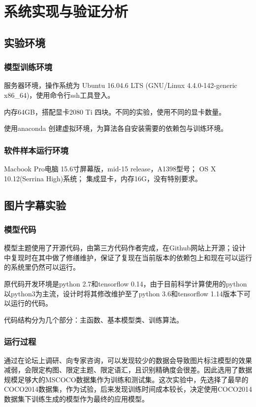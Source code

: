 
\chapter{系统实现与验证分析}
\section{实验环境}
\subsection{模型训练环境}
服务器环境，操作系统为
Ubuntu 16.04.6 LTS (GNU/Linux 4.4.0-142-generic x86\_64)，使用命令行ssh工具登入。

内存64GB，搭配显卡2080 Ti 四块。不同的实验，使用不同的显卡数量。

使用anaconda 创建虚拟环境，为算法各自安装需要的依赖包与训练环境。
\subsection{软件样本运行环境}
Macbook Pro电脑 15.6寸屏幕版，mid-15 release，A1398型号；
OS X 10.12(Serrina High)系统；
集成显卡，内存16G，没有特别要求。

\section{图片字幕实验}
\subsection{模型代码}
模型主题使用了开源代码，由第三方代码作者完成，在Github网站上开源；设计中复现时在其中做了修缮维护，保证了复现在当前版本的依赖包上和现在可以运行的系统里仍然可以运行。

原代码开发环境是python 2.7和tensorflow 0.14，由于目前科学计算使用的python以python3为主流，设计时将其修改维护至了python 3.6和tensorflow 1.14版本下可以运行的代码。

代码结构分为几个部分：主函数、基本模型类、训练算法。
\subsection{运行过程}
通过在论坛上调研、向专家咨询，可以发现较少的数据会导致图片标注模型的效果减弱，会限定构图、限定主题、限定语汇，且识别精确度会很差。因此选用了数据规模足够大的MSCOCO数据集作为训练和测试集。这次实验中，先选择了最早的COCO2014数据集，作为试验，后来发现训练时间成本较长，决定使用COCO2014数据集下训练生成的模型作为最终的应用模型。

